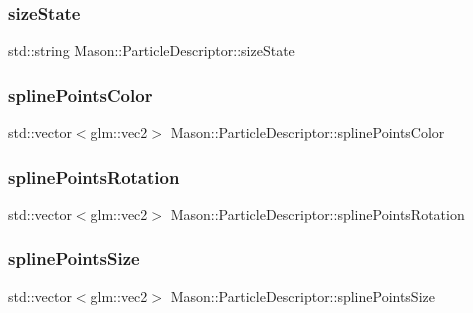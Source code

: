 \subsubsection{\texorpdfstring{size\+State}{sizeState}}
{\footnotesize\ttfamily std\+::string Mason\+::\+Particle\+Descriptor\+::size\+State}

\hypertarget{class_mason_1_1_particle_descriptor_a3a7588bd840bc8010f23bda75ec56e5d}{}\label{class_mason_1_1_particle_descriptor_a3a7588bd840bc8010f23bda75ec56e5d} 
\subsubsection{\texorpdfstring{spline\+Points\+Color}{splinePointsColor}}
{\footnotesize\ttfamily std\+::vector$<$glm\+::vec2$>$ Mason\+::\+Particle\+Descriptor\+::spline\+Points\+Color}

\hypertarget{class_mason_1_1_particle_descriptor_aad86105e768cb5cf59c26d1277ccad2e}{}\label{class_mason_1_1_particle_descriptor_aad86105e768cb5cf59c26d1277ccad2e} 
\subsubsection{\texorpdfstring{spline\+Points\+Rotation}{splinePointsRotation}}
{\footnotesize\ttfamily std\+::vector$<$glm\+::vec2$>$ Mason\+::\+Particle\+Descriptor\+::spline\+Points\+Rotation}

\hypertarget{class_mason_1_1_particle_descriptor_aefa11cd147ec20d3084c661245abb49c}{}\label{class_mason_1_1_particle_descriptor_aefa11cd147ec20d3084c661245abb49c} 
\subsubsection{\texorpdfstring{spline\+Points\+Size}{splinePointsSize}}
{\footnotesize\ttfamily std\+::vector$<$glm\+::vec2$>$ Mason\+::\+Particle\+Descriptor\+::spline\+Points\+Size}

